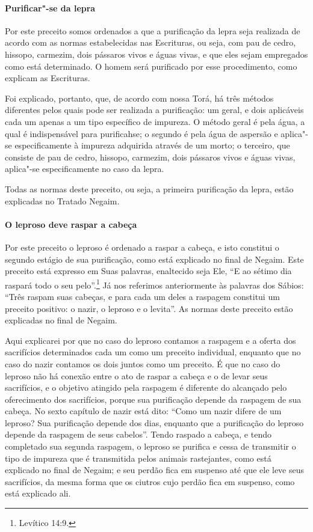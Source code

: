 \begin{multicols}{2}
\paragraph{Purificar"-se da lepra}

Por este preceito somos ordenados a que a purificação da lepra seja
realizada de acordo com as normas estabelecidas nas Escrituras, ou seja,
com pau de cedro, hissopo, carmezim, dois pássaros vivos e águas vivas,
e que eles sejam empregados como está determinado. O homem será
purificado por esse procedimento, como explicam as Escrituras.

Foi explicado, portanto, que, de acordo com nossa Torá\starr, há três
métodos diferentes pelos quais pode ser realizada a purificação: um
geral, e dois aplicáveis cada um apenas a um tipo específico de
impureza. O método geral é pela água, a qual é indispensável para
purificahse; o segundo é pela água de aspersão e aplica"-se
especificamente à impureza adquirida através de um morto; o terceiro,
que consiste de pau de cedro, hissopo, carmezim, dois pássaros vivos e
águas vivas, aplica"-se especificamente no caso da lepra.

Todas as normas deste preceito, ou seja, a primeira purificação da
lepra, estão explicadas no Tratado Negaim\starr.

\paragraph{O leproso deve raspar a cabeça}

Por este preceito o leproso é ordenado a raspar a cabeça, e isto
constitui o segundo estágio de sua purificação, como está explicado no
final de Negaim\starr. Este preceito está expresso em Suas palavras,
enaltecido seja Ele, ``E ao sétimo dia raspará todo o seu pelo''.\footnote{Levítico 14:9.} Já nos referimos anteriormente às palavras dos Sábios:
``Três raspam suas cabeças, e para cada um deles
a raspagem constitui um preceito positivo: o nazir\starr, o leproso e o
levita\starr''. As normas deste preceito estão explicadas no final de Negaim\starr.

Aqui explicarei por que no caso do leproso contamos a raspagem e a
oferta dos sacrifícios determinados cada um como um preceito individual,
enquanto que no caso do nazir\starr{} contamos os dois juntos como um preceito.
É que no caso do leproso não há conexão entre o ato de raspar a cabeça e
o de levar seus sacrifícios, e o objetivo atingido pela raspagem é
diferente do alcançado pelo oferecimento dos sacrifícios, porque sua
purificação depende da raspagem de sua cabeça. No sexto capítulo de
nazir\starr{} está dito: ``Como um nazir\starr{} difere de um leproso? Sua purificação
depende dos dias, enquanto que a purificação do leproso depende da
raspagem de seus cabelos''. Tendo raspado a cabeça, e tendo completado
sua segunda raspagem, o leproso se purifica e cessa de transmitir o tipo
de impureza que é transmitida pelos animais rastejantes, como está
explicado no final de Negaim\starr; e seu perdão fica em suspenso até que ele
leve seus sacrifícios, da mesma forma que os ciutros cujo perdão fica em
suspenso, como está explicado ali.


\end{multicols}
